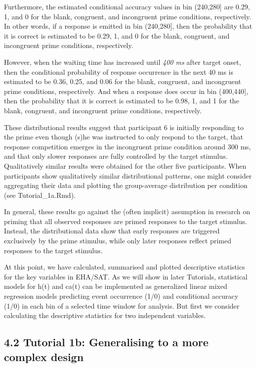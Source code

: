 \documentclass[
  man, donotrepeattitle,floatsintext]{apa6}
\begin{document}
Furthermore, the estimated conditional accuracy values in bin (240,280{]} are 0.29, 1, and 0 for the blank, congruent, and incongruent prime conditions, respectively. In other words, if a response is emitted in bin (240,280{]}, then the probability that it is correct is estimated to be 0.29, 1, and 0 for the blank, congruent, and incongruent prime conditions, respectively.

However, when the waiting time has increased until \emph{400 ms} after target onset, then the conditional probability of response occurrence in the next 40 ms is estimated to be 0.36, 0.25, and 0.06 for the blank, congruent, and incongruent prime conditions, respectively. And when a response does occur in bin (400,440{]}, then the probability that it is correct is estimated to be 0.98, 1, and 1 for the blank, congruent, and incongruent prime conditions, respectively.

These distributional results suggest that participant 6 is initially responding to the prime even though (s)he was instructed to only respond to the target, that response competition emerges in the incongruent prime condition around 300 ms, and that only slower responses are fully controlled by the target stimulus. Qualitatively similar results were obtained for the other five participants. When participants show qualitatively similar distributional patterns, one might consider aggregating their data and plotting the group-average distribution per condition (see Tutorial\_1a.Rmd).

In general, these results go against the (often implicit) assumption in research on priming that all observed responses are primed responses to the target stimulus. Instead, the distributional data show that early responses are triggered exclusively by the prime stimulus, while only later responses reflect primed responses to the target stimulus.

At this point, we have calculated, summarised and plotted descriptive statistics for the key variables in EHA/SAT. As we will show in later Tutorials, statistical models for h(t) and ca(t) can be implemented as generalized linear mixed regression models predicting event occurrence (1/0) and conditional accuracy (1/0) in each bin of a selected time window for analysis. But first we consider calculating the descriptive statistics for two independent variables.

\subsection{4.2 Tutorial 1b: Generalising to a more complex design}\label{tutorial-1b-generalising-to-a-more-complex-design}
\end{document}

